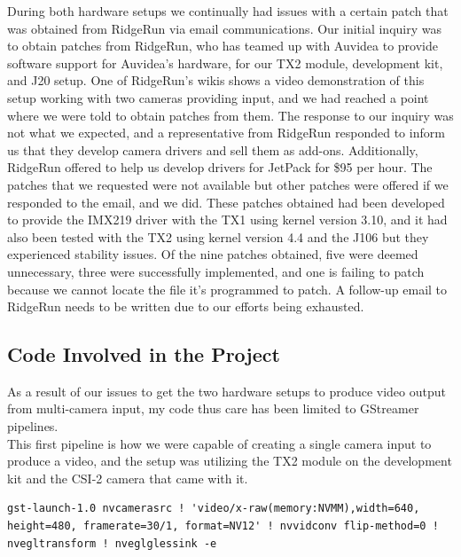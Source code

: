 \documentclass[letterpaper,10pt,serif,draftclsnofoot,onecolumn,compsoc,titlepage]{IEEEtran}
\begin{document}
During both hardware setups we continually had issues with a certain patch that was 
obtained from RidgeRun via email communications. Our initial inquiry was to obtain 
patches from RidgeRun, who has teamed up with Auvidea to provide software support for 
Auvidea's hardware, for our TX2 module, development kit, and J20 setup. One of RidgeRun's 
wikis shows a video demonstration of this setup working with two cameras 
providing input, and we had reached a point where we were told to obtain patches from 
them. The response to our inquiry was not what we expected, and a representative from 
RidgeRun responded to inform us that they develop camera drivers and sell them as 
add-ons. Additionally, RidgeRun offered to help us develop drivers for JetPack for 
\$95 per hour. The patches that we requested were not available but other patches were 
offered if we responded to the email, and we did. These patches obtained had been 
developed to
provide the IMX219 driver with the TX1 using kernel version 3.10, and it had also been
tested with the TX2 using kernel version 4.4 and the J106 but they experienced 
stability issues. Of the nine patches obtained, five were deemed unnecessary, three 
were successfully implemented, and one is failing to patch because we cannot locate 
the file it's programmed to patch. A follow-up email to RidgeRun needs to be written 
due to our efforts being exhausted.\\

\subsection{Code Involved in the Project}

As a result of our issues to get the two hardware setups to produce video output from 
multi-camera input, my code thus care has been limited to GStreamer pipelines. \\

This first pipeline is how we were capable of creating a single camera input to produce 
a video, and the setup was utilizing the TX2 module on the development kit and the 
CSI-2 camera that came with it. \\

\begin{lstlisting}
gst-launch-1.0 nvcamerasrc ! 'video/x-raw(memory:NVMM),width=640, height=480, framerate=30/1, format=NV12' ! nvvidconv flip-method=0 ! nvegltransform ! nveglglessink -e
\end{lstlisting}
\cite{OneCamPipe}
\end{document}
